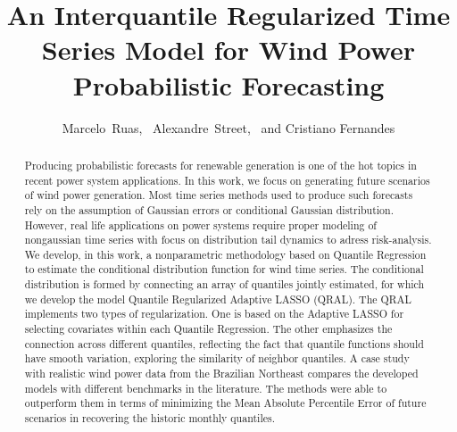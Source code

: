 \documentclass[journal]{IEEEtran}
\begin{document}
\title{An Interquantile Regularized Time Series Model for Wind Power Probabilistic Forecasting}

\author{Marcelo~Ruas,~%
	 	Alexandre~Street,~%
		and Cristiano Fernandes
	
}

\maketitle


\begin{abstract}
Producing probabilistic forecasts for renewable generation is one of the hot topics in recent power system applications. In this work, we focus on generating future scenarios of wind power generation.  Most time series methods used to produce such forecasts rely on the assumption of Gaussian errors or conditional Gaussian distribution. However, real life applications on power systems require proper modeling of nongaussian time series with focus on distribution tail dynamics to adress risk-analysis.  
We develop, in this work, a nonparametric methodology based on Quantile Regression to estimate the conditional distribution function for wind time series.  
The conditional distribution is formed by connecting an array of quantiles jointly estimated, for which we develop the model Quantile Regularized Adaptive LASSO (QRAL).	The QRAL implements two types of regularization. One is based on the Adaptive LASSO for selecting covariates within each Quantile Regression. 
The other emphasizes the connection across different quantiles, reflecting the fact that quantile functions should have smooth variation,
exploring the similarity of neighbor quantiles.	A case study with realistic wind power data from the Brazilian Northeast compares the developed models with different benchmarks in the literature. The methods were able to outperform them in terms of minimizing the Mean Absolute Percentile Error of future scenarios in recovering the historic monthly quantiles.
\end{abstract}
\end{document}
